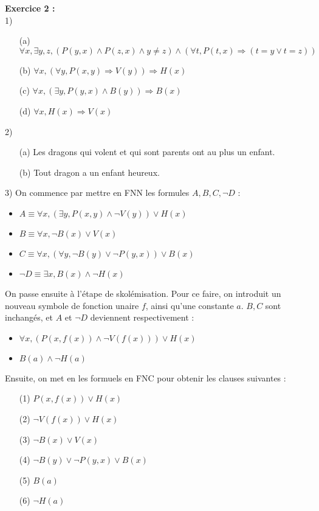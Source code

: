 \documentclass[11pt,a4paper]{article}
\begin{document}
\textbf{Exercice 2 :} \\
1) \begin{enumerate}
\item[(a)] $\forall x, \exists y,z, (P(y,x)\land P(z,x)\land y\neq z)\land (\forall t,P(t,x) \Rightarrow (t =y \lor t=z))$
\item[(b)] $\forall x, (\forall y, P(x,y) \Rightarrow V(y)) \Rightarrow H(x) $
\item[(c)] $\forall x, (\exists y, P(y,x) \land B(y)) \Rightarrow B(x) $
\item[(d)] $\forall x, H(x) \Rightarrow V(x) $ \\
\end{enumerate}

2) \begin{itemize}
\item[(a)] Les dragons qui volent et qui sont parents ont au plus un enfant.
\item[(b)] Tout dragon a un enfant heureux. \\
\end{itemize}

3)  On commence par mettre en FNN les formules $A,B,C,\lnot D$ :
\begin{itemize}
\item $A \equiv \forall x, (\exists y, P(x,y)\land \lnot V(y)) \lor H(x) $
\item $B \equiv \forall x, \lnot B(x) \lor V(x)$
\item $C \equiv \forall x, (\forall y, \lnot B(y) \lor \lnot P(y,x)) \lor B(x)$
\item $\lnot D \equiv \exists x, B(x) \land \lnot H(x)$ \\
\end{itemize}
On passe ensuite à l'étape de skolémisation. Pour ce faire, on introduit un nouveau symbole de fonction unaire $f$, ainsi qu'une constante $a$. $B, C$ sont inchangés, et $A$ et $\lnot D$ deviennent respectivement :
\begin{itemize}
\item $\forall x, (P(x,f(x))\land \lnot V(f(x))) \lor H(x)$
\item $B(a) \land \lnot H(a) $ \\
\end{itemize}

Ensuite, on met en les formuels en FNC pour obtenir les clauses suivantes :
\begin{itemize}
\item[(1)] $P(x,f(x))\lor H(x)$
\item[(2)] $\lnot V(f(x)) \lor H(x) $
\item[(3)] $\lnot B(x) \lor V(x) $
\item[(4)] $\lnot B(y) \lor \lnot P(y,x) \lor B(x) $
\item[(5)] $B(a)$
\item[(6)] $ \lnot H(a) $ 
\end{itemize}
\end{document}
